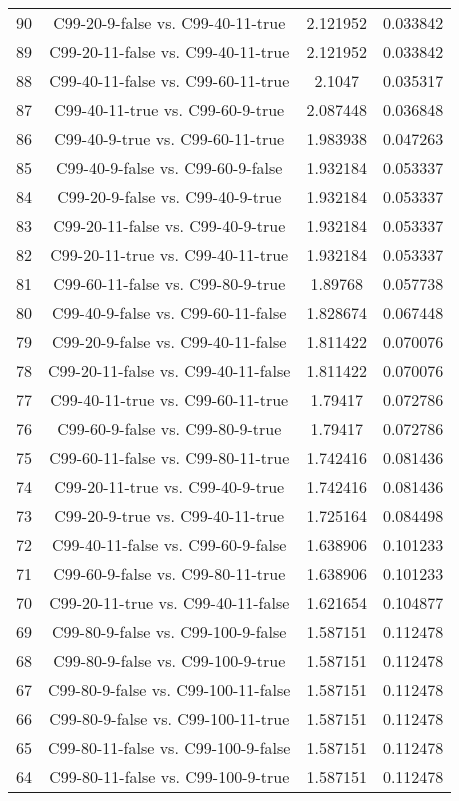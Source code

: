 \documentclass[a4paper,10pt]{article}
\begin{document}
\begin{landscape}
\begin{table}[!htp]
\begin{tabular}{cccc}
90&C99-20-9-false vs. C99-40-11-true&2.121952&0.033842\\
89&C99-20-11-false vs. C99-40-11-true&2.121952&0.033842\\
88&C99-40-11-false vs. C99-60-11-true&2.1047&0.035317\\
87&C99-40-11-true vs. C99-60-9-true&2.087448&0.036848\\
86&C99-40-9-true vs. C99-60-11-true&1.983938&0.047263\\
85&C99-40-9-false vs. C99-60-9-false&1.932184&0.053337\\
84&C99-20-9-false vs. C99-40-9-true&1.932184&0.053337\\
83&C99-20-11-false vs. C99-40-9-true&1.932184&0.053337\\
82&C99-20-11-true vs. C99-40-11-true&1.932184&0.053337\\
81&C99-60-11-false vs. C99-80-9-true&1.89768&0.057738\\
80&C99-40-9-false vs. C99-60-11-false&1.828674&0.067448\\
79&C99-20-9-false vs. C99-40-11-false&1.811422&0.070076\\
78&C99-20-11-false vs. C99-40-11-false&1.811422&0.070076\\
77&C99-40-11-true vs. C99-60-11-true&1.79417&0.072786\\
76&C99-60-9-false vs. C99-80-9-true&1.79417&0.072786\\
75&C99-60-11-false vs. C99-80-11-true&1.742416&0.081436\\
74&C99-20-11-true vs. C99-40-9-true&1.742416&0.081436\\
73&C99-20-9-true vs. C99-40-11-true&1.725164&0.084498\\
72&C99-40-11-false vs. C99-60-9-false&1.638906&0.101233\\
71&C99-60-9-false vs. C99-80-11-true&1.638906&0.101233\\
70&C99-20-11-true vs. C99-40-11-false&1.621654&0.104877\\
69&C99-80-9-false vs. C99-100-9-false&1.587151&0.112478\\
68&C99-80-9-false vs. C99-100-9-true&1.587151&0.112478\\
67&C99-80-9-false vs. C99-100-11-false&1.587151&0.112478\\
66&C99-80-9-false vs. C99-100-11-true&1.587151&0.112478\\
65&C99-80-11-false vs. C99-100-9-false&1.587151&0.112478\\
64&C99-80-11-false vs. C99-100-9-true&1.587151&0.112478\\

\end{tabular}
\end{table}
\end{landscape}
\end{document}
